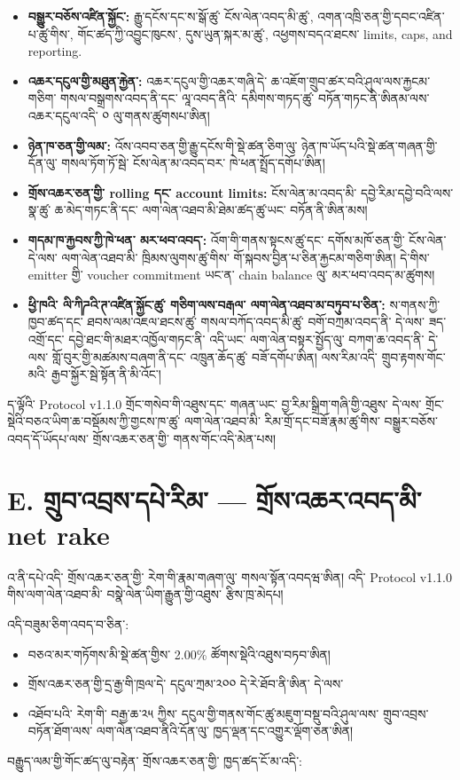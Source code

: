\documentclass[11pt]{article}
\begin{document}
\begin{itemize}[leftmargin=*]
\item \textbf{བསྒྱུར་བཅོས་འཛིན་སྐྱོང་:} རྒྱུ་དངོས་དང་ས་སྒོ་ཚུ་ ངོས་ལེན་འབད་མི་ཚུ་, འགན་འཁྲི་ཅན་གྱི་དབང་འཛིན་པ་ཚུ་གིས་, གོང་ཚད་ཀྱི་འབྱུང་ཁུངས་, དུས་ཡུན་སྐར་མ་ཚུ་, འཕྱགས་བདའ་ཐངས་ limits, caps, and reporting.
\item \textbf{འཆར་དངུལ་གྱི་མཐུན་རྐྱེན་:} འཆར་དངུལ་གྱི་འཆར་གཞི་དེ་ ཆ་འཇོག་གྲུབ་ཚར་བའི་ཤུལ་ལས་རྐྱངམ་གཅིག་ གསལ་བསྒྲགས་འབད་ནི་དང་ ལཱ་འབད་ནིའི་ དམིགས་གཏད་ཚུ་ བཏོན་གཏང་ནི་ཨིནམ་ལས་ འཆར་དངུལ་འདི་ ༠ ལུ་གནས་ཚུགསཔ་ཨིན།
\item \textbf{ཉེན་ཁ་ཅན་གྱི་ལམ་:} འོས་འབབ་ཅན་གྱི་རྒྱུ་དངོས་གི་སྡེ་ཚན་ཅིག་ལུ་ ཉེན་ཁ་ཡོད་པའི་སྡེ་ཚན་གཞན་གྱི་དོན་ལུ་ གསལ་ཏོག་ཏོ་སྦེ་ ངོས་ལེན་མ་འབད་བར་ ཁེ་ཕན་སྤྲོད་དགོཔ་ཨིན།
\item \textbf{གྲོས་འཆར་ཅན་གྱི་ rolling དང་ account limits:} ངོས་ལེན་མ་འབད་མི་ དབྱེ་རིམ་དབྱེ་བའི་ལས་སྣ་ཚུ་ ཆ་མེད་གཏང་ནི་དང་ ལག་ལེན་འཐབ་མི་ཐེམ་ཚད་ཚུ་ཡང་ བཏོན་ནི་ཨིན་མས།
\item \textbf{གདམ་ཁ་རྐྱབས་ཀྱི་ཁེ་ཕན་ མར་ཕབ་འབད་:} འོག་གི་གནས་སྟངས་ཚུ་དང་ དགོས་མཁོ་ཅན་གྱི་ ངོས་ལེན་ དེ་ལས་ ལག་ལེན་འཐབ་མི་ ཁྲིམས་ལུགས་ཚུ་གིས་ གོ་སྐབས་བྱིན་པ་ཅིན་རྐྱངམ་གཅིག་ཨིན། དེ་གིས་ emitter གྱི་ voucher commitment ཡང་ན་ chain balance ལུ་ མར་ཕབ་འབད་མ་ཚུགས།
\item \textbf{ཕྱི་ཁའི་ ལི་ཀིཌའི་ཊ་འཛིན་སྐྱོང་ཚུ་ གཅིག་ལས་བརྒལ་ ལག་ལེན་འཐབ་མ་བཏུབ་པ་ཅིན་:} ས་གནས་ཀྱི་ཁྱབ་ཚད་དང་ ཐབས་ལམ་འཇལ་ཐངས་ཚུ་ གསལ་བཀོད་འབད་མི་ཚུ་ བགོ་བཀྲམ་འབད་ནི་ དེ་ལས་ ཟད་འགྲོ་དང་ དབྱེ་ཐང་གི་མཐར་འཁྱོལ་གཏང་ནི་ འདི་ཡང་ ལག་ལེན་བསྟར་སྤྱོད་ལུ་ བཀག་ཆ་འབད་ནི་ དེ་ལས་ གློ་བུར་གྱི་མཚམས་བཞག་ནི་དང་ འཁྲུན་ཆོད་ཚུ་ བཟོ་དགོཔ་ཨིན། ལས་རིམ་འདི་ གྲུབ་རྟགས་གོང་མའི་ རྒྱབ་སྐྱོར་སྦེ་སྟོན་ནི་མི་འོང་།
\end{itemize}
ད་ལྟོའི་ Protocol v1.1.0 གྲོང་གསེབ་གི་འཐུས་དང་ གཞན་ཡང་ བྱ་རིམ་སྒྲིག་གཞི་གྱི་འཐུས་ དེ་ལས་ གྲོང་སྡེའི་བཅའ་ཡིག་ཆ་བསྡོམས་ཀྱི་གྱངས་ཁ་ཚུ་ ལག་ལེན་འཐབ་མི་ རིམ་གྲོ་དང་བཟོ་རྣམ་ཚུ་གིས་ བསྒྱུར་བཅོས་འབད་དོ་ཡོདཔ་ལས་ གྲོས་འཆར་ཅན་གྱི་ གནས་གོང་འདི་མེན་པས།


\section*{E. གྲུབ་འབྲས་དཔེ་རིམ་ --- གྲོས་འཆར་འབད་མི་ net rake}

འ་ནི་དཔེ་འདི་ གྲོས་འཆར་ཅན་གྱི་ རེག་གི་རྣམ་གཞག་ལུ་ གསལ་སྟོན་འབདཝ་ཨིན། འདི་ Protocol v1.1.0 གིས་ལག་ལེན་འཐབ་མི་ བསྣེ་ལེན་ཡིག་རྒྱུན་གྱི་འཐུས་ རྩིས་ཁྲ་མེདཔ།

འདི་བཟུམ་ཅིག་འབད་བ་ཅིན་:

\begin{itemize}[leftmargin=*]
\item བཅའ་མར་གཏོགས་མི་སྡེ་ཚན་གྱིས་ 2.00\% ཚོགས་སྡེའི་འཐུས་བཏབ་ཨིན།
\item གྲོས་འཆར་ཅན་གྱི་དྲ་རྒྱ་གི་ཁྲལ་དེ་ དངུལ་ཀྲམ་༢༠༠ དེ་རེ་ཐོབ་ནི་ཨིན་ དེ་ལས་
\item འཐོབ་པའི་ རེག་གི་ བརྒྱ་ཆ་༢༥ ཀྱིས་ དངུལ་གྱི་གནས་གོང་ཚུ་མཇུག་བསྡུ་བའི་ཤུལ་ལས་ གྲུབ་འབྲས་བཏོན་ཐོག་ལས་ ལག་ལེན་འཐབ་ནིའི་དོན་ལུ་ ཁྱད་ལྡན་དང་འགྱུར་ལྡོག་ཅན་ཨིན།
\end{itemize}
བརྒྱུད་ལམ་གྱི་གོང་ཚད་ལུ་བརྟེན་ གྲོས་འཆར་ཅན་གྱི་ ཁྱད་ཚད་ངོ་མ་འདི་:
\end{document}
